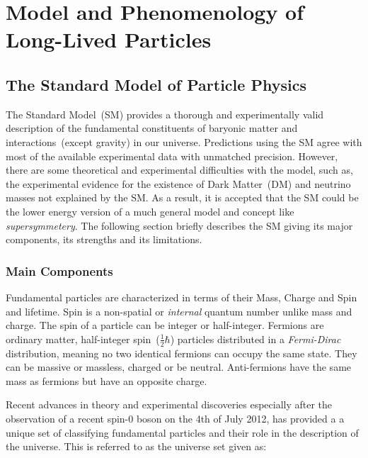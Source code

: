 
\chapter{Model and Phenomenology of Long-Lived Particles}
\label{Long_Lived_Particle_physics_chapter}


\section{The Standard Model of Particle Physics}
The Standard Model~(SM) provides a thorough and experimentally valid description of the fundamental constituents of baryonic matter and interactions~(except gravity) in our universe. Predictions using the SM agree with most of the available experimental data with unmatched precision.
However, there are some theoretical and experimental difficulties with the model, such as, the experimental evidence for the existence of Dark Matter~(DM) and neutrino masses not explained by the SM.  As a result, it is accepted that the SM could be the lower energy version of a much general model and concept like \textit{supersymmetery}.
The following section briefly describes the SM giving its major  components, its strengths and its limitations.
\subsection{Main Components}
Fundamental particles are characterized in terms of their Mass, Charge and Spin and lifetime. Spin is a non-spatial or \textit{internal} quantum number unlike mass and charge. The spin of a particle can be integer or half-integer.
Fermions are ordinary matter, half-integer spin~($\frac{1}{2} \hbar$) particles distributed in a \textit{Fermi-Dirac} distribution, meaning no two identical fermions can occupy the same state. They can be massive or massless, charged or be neutral. Anti-fermions have the same mass as fermions but have an opposite charge.

Recent advances in theory and experimental discoveries especially after the observation of a recent spin-0 boson on the 4th of July 2012, has provided a a unique set of classifying fundamental particles and their role in the description of the universe. This is referred to as the universe set given as:

